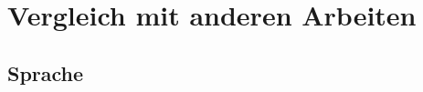 \section{Vergleich mit anderen Arbeiten}
    \subsection{Sprache}
        \label{section:discussionComparisonLanguage}